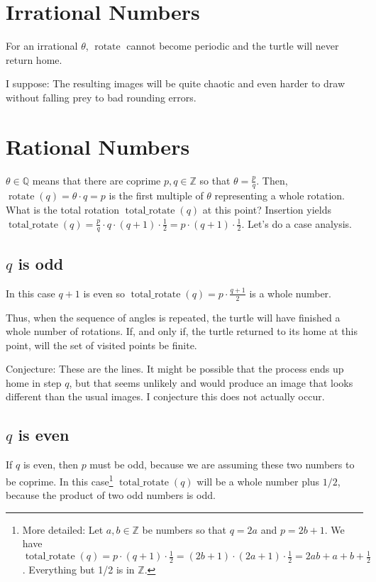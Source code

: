 \documentclass[pdftex,a4paper]{scrartcl}
\DeclareMathOperator{\rotate}{rotate}
\DeclareMathOperator{\total}{total\_rotate}
\begin{document}
\section{Irrational Numbers}
For an irrational \(\theta\), \(\rotate\) cannot become periodic and the turtle will never return home.

I suppose: The resulting images will be quite chaotic and even harder to draw without falling prey to bad rounding
errors.

\section{Rational Numbers}
\(\theta\in\mathbb{Q}\) means that there are coprime \(p,q\in\mathbb{Z}\) so that \(\theta=\frac{p}{q}\). Then,
\(\rotate(q)=\theta\cdot q=p\) is the first multiple of \(\theta\) representing a whole rotation. What is the total
rotation \(\total(q)\) at this point? Insertion yields \(\total(q)=\frac{p}{q}\cdot q\cdot(q+1)\cdot \frac{1}{2}
=p\cdot(q+1)\cdot\frac{1}{2}\).
Let's do a case analysis.

\subsection{$q$ is odd}
In this case \(q+1\) is even so \(\total(q)=p\cdot\frac{q+1}{2}\) is a whole number.

Thus, when the sequence of angles is repeated, the turtle will have finished a whole number of rotations. If, and only
if, the turtle returned to its home at this point, will the set of visited points be finite.

Conjecture: These are the lines. It might be possible that the process ends up home in step \(q\), but that seems
unlikely and would produce an image that looks different than the usual images. I conjecture this does not actually
occur.

\subsection{$q$ is even}
If \(q\) is even, then \(p\) must be odd, because we are assuming these two numbers to be coprime.
In this case\footnote{More detailed: Let \(a,b\in\mathbb{Z}\) be numbers so that \(q=2a\) and \(p=2b+1\). We have
\(\total(q)=p\cdot(q+1)\cdot\frac{1}{2}=(2b+1)\cdot(2a+1)\cdot\frac{1}{2}=2ab+a+b+\frac{1}{2}\). Everything but 1/2 is
in \(\mathbb{Z}\).}
\(\total(q)\) will be a whole number plus \(1/2\), because the product of two odd numbers is odd.
\end{document}
